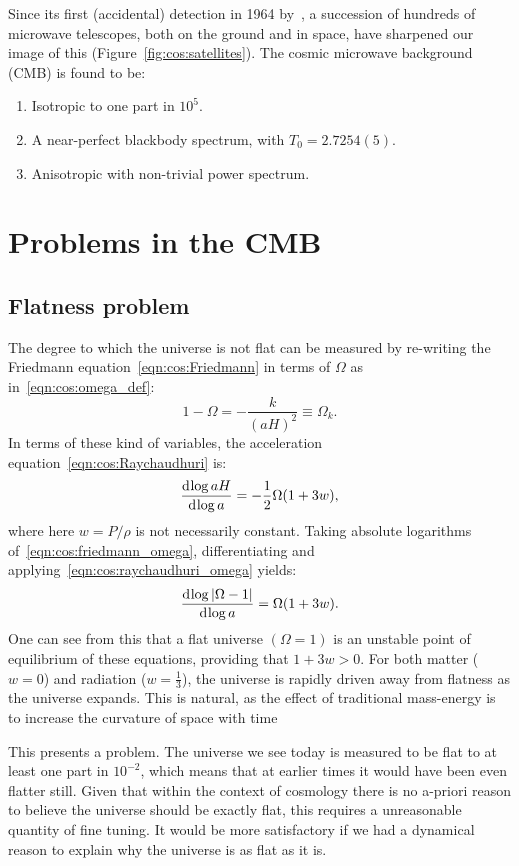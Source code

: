 Since its first (accidental) detection in 1964 by~\cite{PenziasWilson}, a succession of hundreds of microwave telescopes, both on the ground and in space, have sharpened our image of this (Figure~\ref{fig:cos:satellites}).
The cosmic microwave background (CMB) is found to be:
\begin{enumerate}
  \item Isotropic to one part in $10^{5}$.
  \item A near-perfect blackbody spectrum, with $T_0=2.7254(5)$.
  \item Anisotropic with non-trivial power spectrum.
\end{enumerate}

\section{Problems in the CMB}
\subsection{Flatness problem}
The degree to which the universe is not flat can be measured by re-writing the Friedmann equation~\eqref{eqn:cos:Friedmann} in terms of $\Omega$ as in~\eqref{eqn:cos:omega_def}:
\begin{equation}
  1-\Omega = -\frac{k}{{(aH)}^2} \equiv \Omega_k.
  \label{eqn:cos:friedmann_omega}
\end{equation}
In terms of these kind of variables, the acceleration equation~\eqref{eqn:cos:Raychaudhuri} is:
\begin{equation}
  \frac{\operatorname{d}^{}\!{\log aH}}{\operatorname{d}^{}\!{\log a} } = -\frac{1}{2}\Omega(1+3w),
  \label{eqn:cos:raychaudhuri_omega}
\end{equation}
where here $w=P/\rho$ is not necessarily constant.
Taking absolute logarithms of~\eqref{eqn:cos:friedmann_omega}, differentiating and applying~\eqref{eqn:cos:raychaudhuri_omega} yields:
\begin{equation}
  \frac{\operatorname{d}^{}\!{\log |\Omega-1|}}{\operatorname{d}^{}\!{\log a} } = \Omega(1+3w).
  \label{eqn:cos:instability}
\end{equation}
One can see from this that a flat universe $(\Omega=1)$ is an unstable point of equilibrium of these equations, providing that $1+3w>0$. For both matter (${w=0}$) and radiation (${w=\frac{1}{3}}$), the universe is rapidly driven away from flatness as the universe expands. This is natural, as the effect of traditional mass-energy is to increase the curvature of space with time

This presents a problem. The universe we see today is measured to be flat to at least one part in $10^{-2}$, which means that at earlier times it would have been even flatter still. Given that within the context of cosmology there is no a-priori reason to believe the universe should be exactly flat, this requires a unreasonable quantity of fine tuning. It would be more satisfactory if we had a dynamical reason to explain why the universe is as flat as it is.

